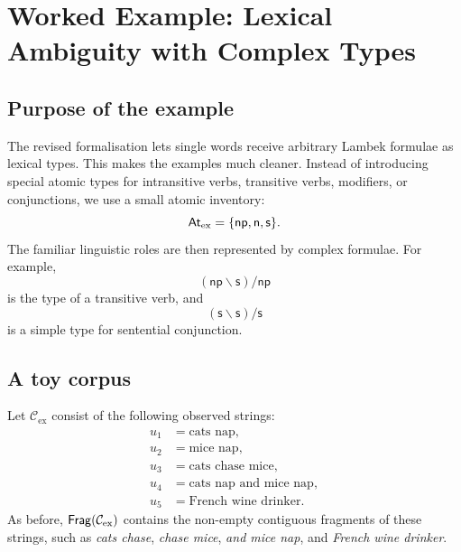 \chapter{Worked Example: Lexical Ambiguity with Complex Types}

\newcommand{\ExNP}{\mathsf{np}}
\newcommand{\ExN}{\mathsf{n}}
\newcommand{\ExS}{\mathsf{s}}
\newcommand{\Parse}{P_{\Lex}}

\section{Purpose of the example}
The revised formalisation lets single words receive arbitrary Lambek formulae as lexical types.
This makes the examples much cleaner. Instead of introducing special atomic types for
intransitive verbs, transitive verbs, modifiers, or conjunctions, we use a small atomic inventory:
\[
\At_{\mathrm{ex}}=\{\ExNP,\ExN,\ExS\}.
\]
The familiar linguistic roles are then represented by complex formulae. For example,
\[
(\ExNP\backslash \ExS)/\ExNP
\]
is the type of a transitive verb, and
\[
(\ExS\backslash \ExS)/\ExS
\]
is a simple type for sentential conjunction.

\section{A toy corpus}
Let $\mathcal C_{\mathrm{ex}}$ consist of the following observed strings:
\[
\begin{array}{ll}
u_1 &= \text{cats nap},\\
u_2 &= \text{mice nap},\\
u_3 &= \text{cats chase mice},\\
u_4 &= \text{cats nap and mice nap},\\
u_5 &= \text{French wine drinker}.
\end{array}
\]
As before, $\mathsf{Frag}(\mathcal C_{\mathrm{ex}})$ contains the non-empty contiguous fragments of these
strings, such as \emph{cats chase}, \emph{chase mice}, \emph{and mice nap}, and
\emph{French wine drinker}.

